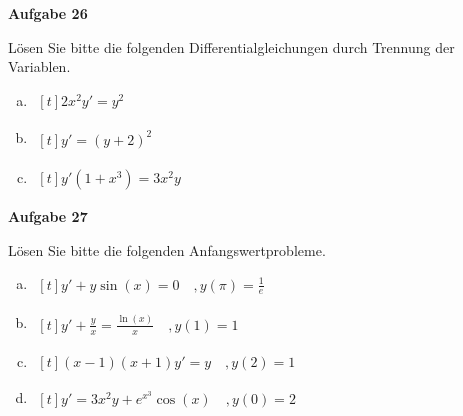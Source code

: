\documentclass[a4paper,12pt]{article}
\newcommand{\Aufgabe}[1]{
	{
		\vspace*{0.5cm}
		\textsf{\textbf{Aufgabe #1}}
		\vspace*{0.2cm}
		
	}
}
\begin{document}

\Aufgabe{26}
Lösen Sie bitte die folgenden Differentialgleichungen durch Trennung der Variablen.
\begin{multicols}{2}
	\begin{enumerate}[(a)]
		\item $\begin{aligned}[t]
		2x^2y' = y^2
		\end{aligned}$ 
		\item $\begin{aligned}[t]
		y' = (y+2)^2
		\end{aligned}$ 
		\item $\begin{aligned}[t]
		y'(1+x^3) = 3x^2y
		\end{aligned}$ 
	\end{enumerate}
\end{multicols}

\Aufgabe{27}
Lösen Sie bitte die folgenden Anfangswertprobleme.
\begin{multicols}{2}
	\begin{enumerate}[a)]
		\item $\begin{aligned}[t]
		y' + y\sin(x) = 0 \quad , y(\pi) = \frac{1}{e}
		\end{aligned}$ 
		\item $\begin{aligned}[t]
		y' + \frac{y}{x} = \frac{\ln(x)}{x} \quad  , y(1) = 1
		\end{aligned}$ 
		\item $\begin{aligned}[t]
		(x-1)(x+1)y' = y \quad  , y(2) = 1
		\end{aligned}$ 
		\item $\begin{aligned}[t]
		y' = 3x^2y + e^{x^3}\cos(x) \quad  , y(0) = 2
		\end{aligned}$ 
	\end{enumerate}
\end{multicols}
\end{document}

